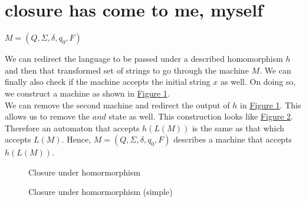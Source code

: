 \documentclass[11pt,letterpaper]{article}
\begin{document}
\section{closure has come to me, myself}
\begin{center}
    $M = (Q,\Sigma,\delta,q_0,F)$
\end{center}
We can redirect the language to be passed under a described homomorphism $h$ and then that transformed set of strings to go through the machine $M$. We can finally also check if the machine accepts the initial string $x$ as well. On doing so, we construct a machine as shown in  \hyperref[fig:4a]{Figure 1}. \\
We can remove the second machine and redirect the output of $h$ in \hyperref[fig:4a]{Figure 1}. This allows us to remove the $and$ state as well. This construction looks like \hyperref[fig:4b]{Figure 2}.
Therefore an automaton that accepts $h(L(M))$ is the same as that which accepts $L(M)$. Hence, $M = (Q,\Sigma,\delta,q_0,F)$ describes a machine that accepts $h(L(M))$. \pagebreak
\begin{figure}[!htp]
\label{fig:4a}
\centering
{}
\caption{Closure under homormorphism}
\end{figure}
\begin{figure}[!htp]
\label{fig:4b}
\centering
{}
\caption{Closure under homormorphism (simple)}
\end{figure}
\end{document}
